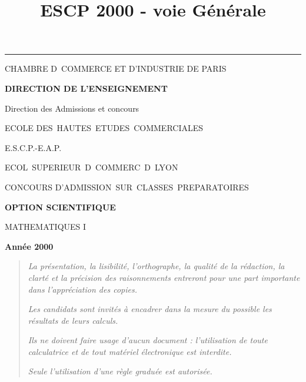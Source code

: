 \documentclass[11pt]{article}%
\title{\bf \vspace{-2cm} ESCP 2000 - voie Générale} %
\author{} %
\date{} %
\begin{document}
\maketitle %
\vspace{-1.4cm}\hrule %
\thispagestyle{fancy}

\vspace*{.2cm}




\begin{center}
{\small CHAMBRE D\E\ COMMERCE ET D'INDUSTRIE DE PARIS}

\textbf{DIRECTION DE L'ENSEIGNEMENT}

Direction des Admissions et concours

\underline{\hspace*{3cm}}

{\Large ECOLE DES\ HAUTES\ ETUDES\ COMMERCIALES}

{\Large E.S.C.P.-E.A.P.}

{\Large ECOL\E\ SUPERIEUR\E\ D\E\ COMMERC\E\ D\E\ LYON}{\large }

CONCOURS D'ADMISSION\ SUR\ CLASSES\ PREPARATOIRES

\underline{\hspace*{3cm}}

\textbf{OPTION SCIENTIFIQUE}

{\Large MATHEMATIQUES I}

\textbf{Année 2000}

\underline{\hspace*{3cm}}
\end{center}

\begin{quotation}
\noindent \textsl{La présentation, la lisibilité, l'orthographe, la
qualité
de la rédaction, la clarté et la précision des raisonnements entreront
pour
une part importante dans l'appréciation des copies.}

\noindent \textsl{Les candidats sont invités à encadrer dans la mesure
du
possible les résultats de leurs calculs.}

\noindent \textsl{Ils ne doivent faire usage d'aucun document :
l'utilisation de toute calculatrice et de tout matériel électronique
est
interdite.}

\noindent \textsl{Seule l'utilisation d'une règle graduée est
autorisée.}

\noindent \textsl{\hrulefill }
\end{quotation}
\end{document}
